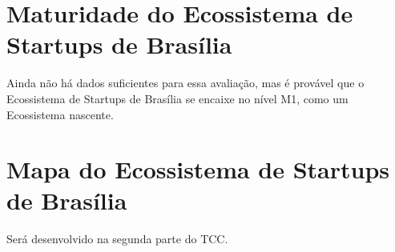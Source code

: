 \section{Maturidade do Ecossistema de Startups de Brasília}
\label{section:maturidade_do_ecossistema_de_startups_de_brasilia}

Ainda não há dados suficientes para essa avaliação, mas é provável que o Ecossistema de Startups de Brasília se encaixe no nível M1, como um Ecossistema nascente.

\section{Mapa do Ecossistema de Startups de Brasília}
\label{section:mapa_do_ecossistema}

Será desenvolvido na segunda parte do TCC.